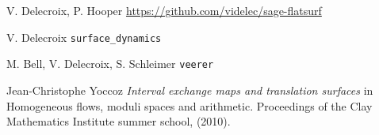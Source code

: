 \documentclass{article}
\begin{document}
\begin{thebibliography}{sage-flatsurf}

V. Delecroix, P. Hooper
\url{https://github.com/videlec/sage-flatsurf}

V. Delecroix
\texttt{surface\_dynamics}

M. Bell, V. Delecroix, S. Schleimer
\texttt{veerer}

Jean-Christophe Yoccoz
\textit{Interval exchange maps and translation surfaces}
in Homogeneous flows, moduli spaces and arithmetic.
Proceedings of the Clay Mathematics Institute summer school,
(2010).
\end{thebibliography}
\end{document}
